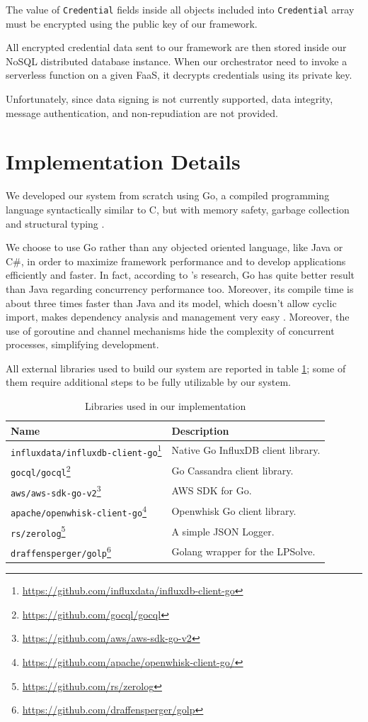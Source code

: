 \documentclass[12pt,a4paper]{report}
\begin{document}
The value of \texttt{Credential} fields inside all objects included into \texttt{Credential} array must be encrypted using the public key of our framework. 

All encrypted credential data sent to our framework are then stored inside our NoSQL distributed database instance. When our orchestrator need to invoke a serverless function on a given FaaS, it decrypts credentials using its private key.

Unfortunately, since data signing is not currently supported, data integrity, message authentication, and non-repudiation are not provided.

\section{Implementation Details}

We developed our system from scratch using Go\cite{Go}, a compiled programming language syntactically similar to C, but with memory safety, garbage collection and structural typing \cite{go2}.

We choose to use Go rather than any objected oriented language, like Java or C\#, in order to maximize framework performance and to develop applications efficiently and faster. In fact, according to \citet{JAVAVSGO}'s research, Go has quite better result than Java regarding concurrency performance too. Moreover, its compile time  is about three times faster than Java and its model, which doesn't allow cyclic import, makes dependency analysis and management very easy \cite{JAVAVSGO}. Moreover, the use of goroutine and channel mechanisms hide the complexity of concurrent processes, simplifying development.

All external libraries used to build our system are reported in table \ref{tab:libraries}; some of them require additional steps to be fully utilizable by our system. 

\begin{table}
	\caption{Libraries used in our implementation}
	\label{tab:libraries}
	\begin{tabular}{l|l}
		\toprule
		Name & Description \\
		\midrule
		\texttt{influxdata/influxdb-client-go}\footnote{\url{https://github.com/influxdata/influxdb-client-go}} & Native Go InfluxDB client library.  \\
		\texttt{gocql/gocql}\footnote{\url{https://github.com/gocql/gocql}} & Go Cassandra client library. \\
		\texttt{aws/aws-sdk-go-v2}\footnote{\url{https://github.com/aws/aws-sdk-go-v2}} & AWS SDK for Go. \\
		\texttt{apache/openwhisk-client-go}\footnote{\url{https://github.com/apache/openwhisk-client-go/}} & Openwhisk Go client library. \\
		\texttt{rs/zerolog}\footnote{\url{https://github.com/rs/zerolog}} & A simple JSON Logger. \\
		\texttt{draffensperger/golp}\footnote{\url{https://github.com/draffensperger/golp}} & Golang wrapper for the LPSolve. \\
		\bottomrule
	\end{tabular}
\end{table}
\end{document}
